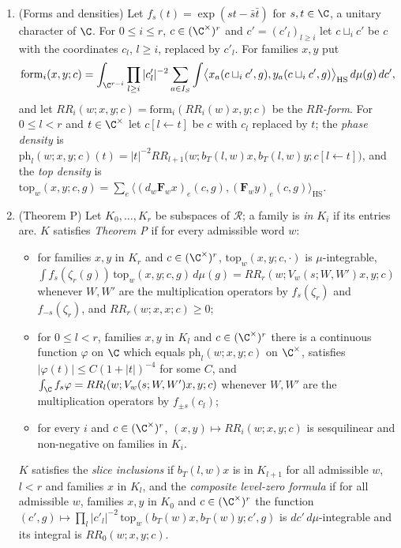 \begin{definition}
\begin{enumerate}[label=(\alph*)]
\item (Forms and densities) Let $f_s(t)=\exp(st-\bar s\bar t)$ for $s,t\in\C$, a unitary character of $\C$. For $0\le i\le r$,
$c\in(\C^\times)^r$ and $c'=(c'_l)_{l\ge i}$ let $c\sqcup_ic'$ be $c$ with the coordinates $c_l$, $l\ge i$, replaced by $c'_l$.
For families $x,y$ put
\begin{equation}\label{eq:pf:sh-curv:form}
\mathrm{form}_i(x,y;c)=\int_{\C^{r-i}}\prod_{l\ge i}|c'_l|^{-2}\sum_{a\in I_S}
\int\bigl\langle x_a(c\sqcup_ic',g),y_a(c\sqcup_ic',g)\bigr\rangle_{\mathrm{HS}}\,d\mu(g)\,dc' ,
\end{equation}
and let $RR_i(w;x,y;c)=\mathrm{form}_i(RR_i(w)x,y;c)$ be the \emph{$RR$-form}. For $0\le l<r$ and $t\in\C^\times$ let
$c[l\leftarrow t]$ be $c$ with $c_l$ replaced by $t$; the \emph{phase density} is
$\mathrm{ph}_l(w;x,y;c)(t)=|t|^{-2}RR_{l+1}\bigl(w;b_T(l,w)x,b_T(l,w)y;c[l\leftarrow t]\bigr)$, and the \emph{top density}
is $\mathrm{top}_w(x,y;c,g)=\sum_e\bigl\langle(d_w\mathbf F_wx)_e(c,g),(\mathbf F_wy)_e(c,g)\bigr\rangle_{\mathrm{HS}}$.
\item (Theorem P) Let $K_0,\dots,K_r$ be subspaces of $\mathcal R$; a family is \emph{in $K_i$} if its entries are. $K$
satisfies \emph{Theorem P} if for every admissible word $w$:
\begin{itemize}
\item[(TopP)] for families $x,y$ in $K_r$ and $c\in(\C^\times)^r$, $\mathrm{top}_w(x,y;c,\cdot)$ is $\mu$-integrable,
$\int f_s(\zeta_r(g))\,\mathrm{top}_w(x,y;c,g)\,d\mu(g)=RR_r(w;V_w(s;W,W')x,y;c)$ whenever $W,W'$ are the multiplication
operators by $f_s(\zeta_r)$ and $f_{-s}(\zeta_r)$, and $RR_r(w;x,x;c)\ge0$;
\item[(StepP)] for $0\le l<r$, families $x,y$ in $K_l$ and $c\in(\C^\times)^r$ there is a continuous function $\varphi$ on
$\C$ which equals $\mathrm{ph}_l(w;x,y;c)$ on $\C^\times$, satisfies $|\varphi(t)|\le C(1+|t|)^{-4}$ for some $C$, and
$\int_\C f_s\varphi=RR_l(w;V_w(s;W,W')x,y;c)$ whenever $W,W'$ are the multiplication operators by $f_{\pm s}(c_l)$;
\item[(PosP)] for every $i$ and $c\in(\C^\times)^r$, $(x,y)\mapsto RR_i(w;x,y;c)$ is sesquilinear and non-negative on families
in $K_i$.
\end{itemize}
$K$ satisfies the \emph{slice inclusions} if $b_T(l,w)x$ is in $K_{l+1}$ for all admissible $w$, $l<r$ and families $x$ in
$K_l$, and the \emph{composite level-zero formula} if for all admissible $w$, families $x,y$ in $K_0$ and $c\in(\C^\times)^r$
the function $(c',g)\mapsto\prod_l|c'_l|^{-2}\,\mathrm{top}_w(b_T(w)x,b_T(w)y;c',g)$ is $dc'\,d\mu$-integrable and its
integral is $RR_0(w;x,y;c)$.
\end{enumerate}
\end{definition}

